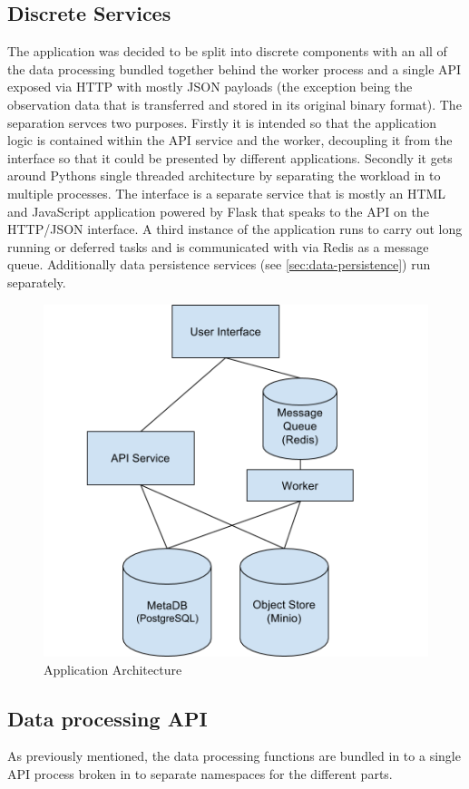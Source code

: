 \documentclass[../report.tex]{subfiles}
\begin{document}
\subsection{Discrete Services}

	The application was decided to be split into discrete components with an all of the data processing bundled together behind the worker process and a single API exposed via HTTP with mostly JSON payloads (the exception being the observation data that is transferred and stored in its original binary format).  The separation servces two purposes.  Firstly it is intended so that the application logic is contained within the API service and the worker, decoupling it from the interface so that it could be presented by different applications.  Secondly it gets around Pythons single threaded architecture by separating the workload in to multiple processes.  The interface is a separate service that is mostly an HTML and JavaScript application powered by Flask that speaks to the API on the HTTP/JSON interface.  A third instance of the application runs to carry out long running or deferred tasks and is communicated with via Redis as a message queue.  Additionally data persistence services (see \cref{sec:data-persistence}) run separately.
	
\begin{figure}[h]
	\centering
	\includegraphics[width=.5\linewidth]{img/architecture}
	\caption{Application Architecture}
	\label{fig:architecture}
\end{figure}

\subsection{Data processing API}

	As previously mentioned, the data processing functions are bundled in to a single API process broken in to separate namespaces for the different parts.
\end{document}
